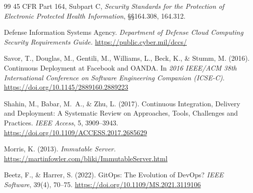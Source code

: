\documentclass[11pt]{article}
\begin{document}
\begin{thebibliography}{99}
45 CFR Part 164, Subpart C, \textit{Security Standards for the Protection of Electronic Protected Health Information}, \S\S164.308, 164.312.

Defense Information Systems Agency. \textit{Department of Defense Cloud Computing Security Requirements Guide.} \url{https://public.cyber.mil/dccs/}

Savor, T., Douglas, M., Gentili, M., Williams, L., Beck, K., \& Stumm, M. (2016). Continuous Deployment at Facebook and OANDA. In \textit{2016 IEEE/ACM 38th International Conference on Software Engineering Companion (ICSE-C)}. \url{https://doi.org/10.1145/2889160.2889223}

Shahin, M., Babar, M.~A., \& Zhu, L. (2017). Continuous Integration, Delivery and Deployment: A Systematic Review on Approaches, Tools, Challenges and Practices. \textit{IEEE Access}, 5, 3909--3943. \url{https://doi.org/10.1109/ACCESS.2017.2685629}

Morris, K. (2013). \textit{Immutable Server.} \url{https://martinfowler.com/bliki/ImmutableServer.html}

Beetz, F., \& Harrer, S. (2022). GitOps: The Evolution of DevOps? \textit{IEEE Software}, 39(4), 70--75. \url{https://doi.org/10.1109/MS.2021.3119106}

\end{thebibliography}
\end{document}

